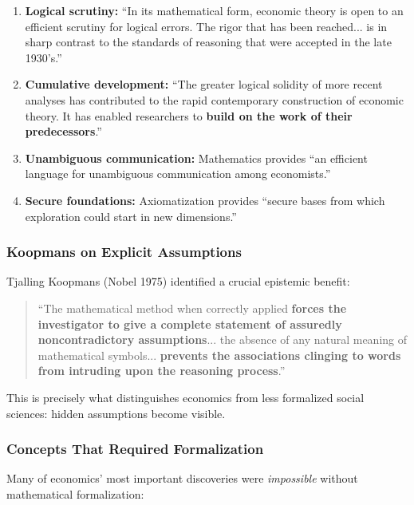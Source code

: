 \begin{enumerate}[nosep]
    \item \textbf{Logical scrutiny:} ``In its mathematical form, economic theory is open
        to an efficient scrutiny for logical errors. The rigor that has been reached...
        is in sharp contrast to the standards of reasoning that were accepted in the
        late 1930's.''
    \item \textbf{Cumulative development:} ``The greater logical solidity of more recent
        analyses has contributed to the rapid contemporary construction of economic theory.
        It has enabled researchers to \textbf{build on the work of their predecessors}.''
    \item \textbf{Unambiguous communication:} Mathematics provides ``an efficient language
        for unambiguous communication among economists.''
    \item \textbf{Secure foundations:} Axiomatization provides ``secure bases from which
        exploration could start in new dimensions.''
\end{enumerate}

\subsubsection{Koopmans on Explicit Assumptions}

Tjalling Koopmans (Nobel 1975) identified a crucial epistemic benefit:
\begin{quote}
``The mathematical method when correctly applied \textbf{forces the investigator to give
a complete statement of assuredly noncontradictory assumptions}... the absence of any
natural meaning of mathematical symbols... \textbf{prevents the associations clinging
to words from intruding upon the reasoning process}.'' \citep{koopmans1957three}
\end{quote}

This is precisely what distinguishes economics from less formalized social sciences:
hidden assumptions become visible.

\subsubsection{Concepts That Required Formalization}

Many of economics' most important discoveries were \textit{impossible} without
mathematical formalization:

